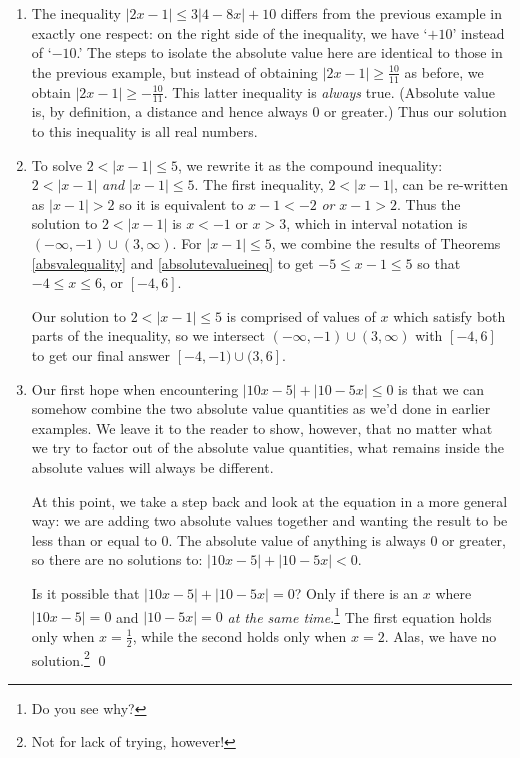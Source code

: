 \begin{ex}
\begin{enumerate}
\item  The inequality  $|2x - 1| \leq 3|4 - 8x| + 10$ differs from the previous example in exactly one respect: on the right side of the inequality, we have `$+10$' instead of `$-10$.' The steps to isolate the absolute value here are identical to those in the previous example, but instead of obtaining $|2x - 1| \geq  \frac{10}{11}$ as before, we obtain $|2x - 1| \geq  -\frac{10}{11}$.  This latter inequality is \textit{always} true. (Absolute value is, by definition, a distance and hence always $0$ or greater.)  Thus our solution to this inequality is all real numbers.


\item  To solve  $2 < |x-1| \leq 5$, we rewrite it as the compound inequality: $2 < |x-1|$ \textit{and} $|x-1| \leq 5$.   The first inequality, $2 < |x-1|$, can be re-written as $|x-1|>2$ so it is equivalent to  $x-1 < -2$ \textit{or} $x-1 > 2$.  Thus the solution to $2 < |x-1|$ is $x<-1$ or $x>3$, which in interval notation is  $(-\infty, -1) \cup (3, \infty)$.  For $|x-1| \leq 5$, we combine the results of Theorems \ref{absvalequality} and \ref{absolutevalueineq} to get $-5 \leq x-1 \leq 5$ so that $-4 \leq x \leq 6$, or $[-4,6]$.  

\medskip

Our solution to   $2 < |x-1| \leq 5$ is comprised of values of $x$ which satisfy both parts of the inequality, so we intersect $(-\infty, -1) \cup (3, \infty)$ with $[-4,6]$ to get our final answer $[-4,-1) \cup (3,6]$. 

\item Our first hope when encountering $|10 x - 5| + |10 - 5x| \leq 0$ is that we can somehow combine the two absolute value quantities as we'd done in earlier examples.  We leave it to the reader to show, however, that no matter what we try to factor out of the absolute value quantities, what remains inside the absolute values will always be different.  

At this point, we take a step back and look at the equation in a more general way:  we are adding two absolute values together and wanting the result to be less than or equal to $0$.  The absolute value of anything is always $0$ or greater, so there are no solutions to:  $|10x - 5| + |10 - 5x| < 0$.  

\medskip

Is it possible that $|10x - 5| + |10 - 5x| = 0$?  Only if there is an $x$ where $|10x-5| = 0$ and $|10-5x| = 0$ \textit{at the same time}.\footnote{Do you see why?}  The first equation holds only when $x = \frac{1}{2}$, while the second holds only when $x = 2$.  Alas, we have no solution.\footnote{Not for lack of trying, however!}   \qed

\end{enumerate}

\end{ex}

